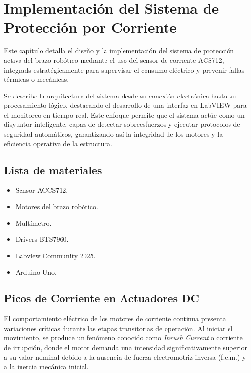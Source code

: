 \chapter{Implementación del Sistema de Protección por Corriente}
\lineaLateral

\begin{resumenCapitulo}
Este capítulo detalla el diseño y la implementación del sistema de protección activa del brazo robótico mediante el uso del sensor de corriente ACS712, integrads estratégicamente para supervisar el consumo eléctrico y prevenir fallas térmicas o mecánicas. 

Se describe la arquitectura del sistema desde su conexión electrónica hasta su procesamiento lógico, destacando el desarrollo de una interfaz en LabVIEW para el monitoreo en tiempo real. Este enfoque permite que el sistema actúe como un disyuntor inteligente, capaz de detectar sobreesfuerzos y ejecutar protocolos de seguridad automáticos, garantizando así la integridad de los motores y la eficiencia operativa de la estructura.
\end{resumenCapitulo}

\section{Lista de materiales}
\begin{itemize}
	\item Sensor ACCS712.
	\item Motores del brazo robótico.
	\item Multímetro.
	\item Drivers BTS7960.
	\item Labview Community 2025.
	\item Arduino Uno.
\end{itemize}


\section{Picos de Corriente en Actuadores DC}

El comportamiento eléctrico de los motores de corriente continua presenta variaciones críticas durante las etapas transitorias de operación. Al iniciar el movimiento, se produce un fenómeno conocido como \textit{Inrush Current} o corriente de irrupción, donde el motor demanda una intensidad significativamente superior a su valor nominal debido a la ausencia de fuerza electromotriz inversa (f.e.m.) y a la inercia mecánica inicial. 

